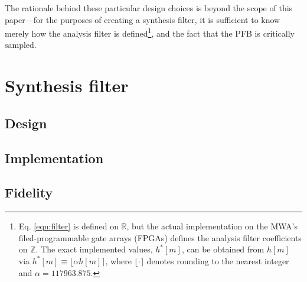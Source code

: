 \documentclass{pasa}%
\begin{document}
The rationale behind these particular design choices is beyond the scope of this paper---for the purposes of creating a synthesis filter, it is sufficient to know merely how the analysis filter is defined\footnote{Eq. \eqref{eqn:filter} is defined on $\mathbb{R}$, but the actual implementation on the MWA's filed-programmable gate arrays (FPGAs) defines the analysis filter coefficients on $\mathbb{Z}$. The exact implemented values, $h^\ast[m]$, can be obtained from $h[m]$ via $h^\ast[m] \equiv \lfloor\alpha h[m]\rceil$, where $\lfloor\cdot\rceil$ denotes rounding to the nearest integer and $\alpha = 117963.875$.}, and the fact that the PFB is critically sampled.

\section{Synthesis filter}
\label{sec:ipfb}

\subsection{Design}

\subsection{Implementation}

\subsection{Fidelity}
\end{document}
